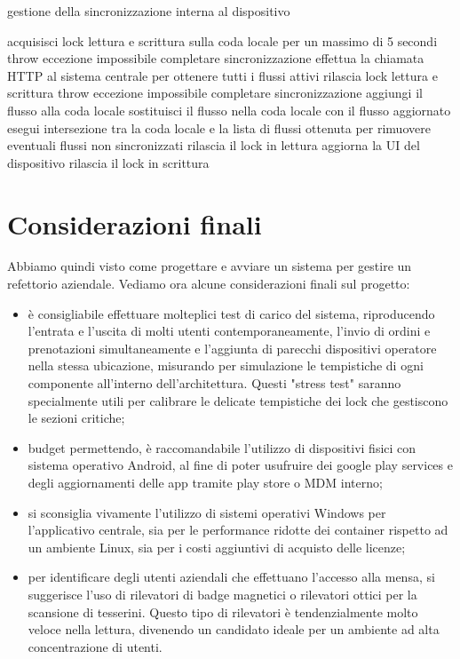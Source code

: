 \documentclass[a4paper, titlepage, 12pt, openright, oneside]{book}
\begin{document}
\begin{algorithm}
\caption{gestione della sincronizzazione interna al dispositivo}
\begin{algorithmic}[1]
\State acquisisci lock lettura e scrittura sulla coda locale per un massimo di 5 secondi
\State throw eccezione impossibile completare sincronizzazione
\EndIf
\State effettua la chiamata HTTP al sistema centrale per ottenere tutti i flussi attivi
	\State rilascia lock lettura e scrittura
	\State throw eccezione impossibile completare sincronizzazione
\EndIf
{}
		\State aggiungi il flusso alla coda locale
		\State sostituisci il flusso nella coda locale con il flusso aggiornato
	\EndIf
\EndFor
\State esegui intersezione tra la coda locale e la lista di flussi ottenuta per rimuovere eventuali flussi non sincronizzati
\State rilascia il lock in lettura
\State aggiorna la UI del dispositivo
\State rilascia il lock in scrittura
\end{algorithmic}
\end{algorithm}

\section{Considerazioni finali}

Abbiamo quindi visto come progettare e avviare un sistema per gestire un refettorio aziendale. Vediamo ora alcune considerazioni finali sul progetto:

\begin{itemize}
\item è consigliabile effettuare molteplici test di carico del sistema, riproducendo l'entrata e l'uscita di molti utenti contemporaneamente, l'invio di ordini e prenotazioni simultaneamente e l'aggiunta di parecchi dispositivi operatore nella stessa ubicazione, misurando per simulazione le tempistiche di ogni componente all'interno dell'architettura. Questi "stress test" saranno specialmente utili per calibrare le delicate tempistiche dei lock che gestiscono le sezioni critiche;
\item budget permettendo, è raccomandabile l'utilizzo di dispositivi fisici con sistema operativo Android, al fine di poter usufruire dei google play services e degli aggiornamenti delle app tramite play store o MDM interno;
\item si sconsiglia vivamente l'utilizzo di sistemi operativi Windows per l'applicativo centrale, sia per le performance ridotte dei container rispetto ad un ambiente Linux, sia per i costi aggiuntivi di acquisto delle licenze;
\item per identificare degli utenti aziendali che effettuano l'accesso alla mensa, si suggerisce l'uso di rilevatori di badge magnetici o rilevatori ottici per la scansione di tesserini. Questo tipo di rilevatori è tendenzialmente molto veloce nella lettura, divenendo un candidato ideale per un ambiente ad alta concentrazione di utenti.

\end{itemize}
\end{document}

